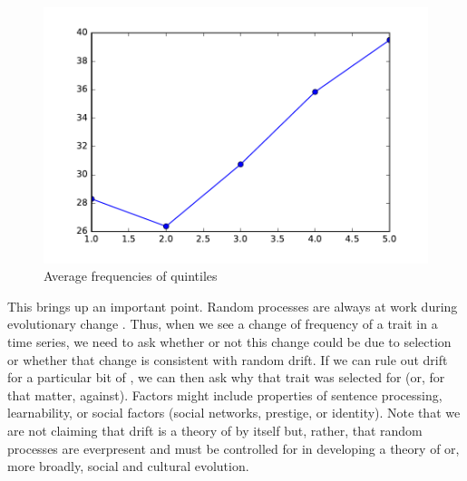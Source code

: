 \documentclass[output=paper]{langsci/langscibook}
\begin{document}
\begin{figure}[ht]
  \centering
  \includegraphics[width=.8\linewidth]{./img/smooth_data.pdf}
  \caption{Average frequencies of quintiles}
  \label{smoothed}
\end{figure}


This brings up an important point.  Random processes are always at
work during evolutionary change \citep{kimura:1983}.  Thus, when we
see a change of frequency of a trait in a time series, we need to ask
whether or not this change could be due to selection or whether that
change is consistent with random drift.  If we can rule out drift for
a particular bit of , we can then ask why that trait
was selected for (or, for that matter, against).  Factors might
include properties of sentence processing, learnability, or social
factors (social networks, prestige, or identity).  Note that we are
not claiming that drift is a theory of  by itself but,
rather, that random processes are everpresent and must be controlled
for in developing a theory of  or, more broadly, social
and cultural evolution.
\end{document}
